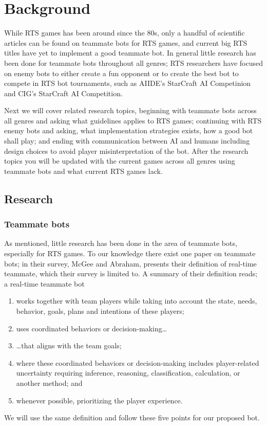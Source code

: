 \chapter{Background}
While RTS games has been around since the 80s\cite{adams06, rtsHistory}, only a handful of scientific articles can be found on teammate bots for RTS games, and current big RTS titles have yet to implement a good teammate bot. In general little research has been done for teammate bots throughout all genres; RTS researchers have focused on enemy bots to either create a fun opponent
or to create the best bot to compete in RTS bot tournaments, such as  AIIDE's StarCraft AI Competinion\cite{scaiide} and CIG's StarCraft AI Competition\cite{sccig}.

Next we will cover related research topics, beginning with teammate bots across all genres and asking what guidelines applies to RTS games; continuing with RTS enemy bots and asking, what implementation strategies exists, how a good bot shall play; and ending with communication between AI and humans including design choices to avoid player misinterpretation of the bot. After the research topics you will be updated with the current games across all genres using teammate bots and what current RTS games lack.

\section{Research}
\subsection{Teammate bots}
\label{sec:teammate_bots}
As mentioned, little research has been done in the area of teammate bots, especially for RTS games. To our knowledge there exist one paper on teammate bots\cite{mcgee10}; in their survey, McGee and Abraham, presents their definition of real-time teammate, which their survey is limited to. A summary of their definition reads; a real-time teammate bot
\begin{enumerate}
	\item works together with team players while taking into account the state, needs, behavior, goals, plans and intentions of these players;
	\item uses coordinated behaviors or decision-making\ldots
	\item {\ldots}that aligns with the team goals;
	\item where these coordinated behaviors or decision-making includes player-related uncertainty requiring inference, reasoning, classification, calculation, or another method; and
	\item whenever possible, prioritizing the player experience.
\end{enumerate}
We will use the same definition and follow these five points for our proposed bot.

